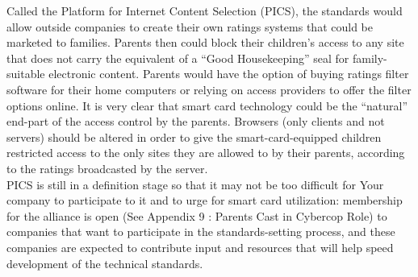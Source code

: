 Called the Platform for Internet Content Selection (PICS), the
standards would allow outside companies to create their own ratings
systems that could be marketed to families. Parents then could block
their children's access to any site that does not carry the equivalent
of a ``Good Housekeeping'' seal for family-suitable electronic content.
Parents would have the option of buying ratings filter software for
their home computers or relying on access providers to offer the filter
options online. It is very clear that smart card technology could be
the ``natural'' end-part of the access control by the parents. Browsers
(only clients and not servers) should be altered in order to give the
smart-card-equipped children restricted access to the only sites they
are allowed to by their parents, according to the ratings broadcasted
by the server.\\

PICS is still in a definition stage so that it may not be too difficult for
Your company to participate to it and to urge for smart card utilization:
membership for the alliance is open (See Appendix 9 :
Parents Cast in Cybercop Role) to companies that want to participate in the
standards-setting process, and these companies are expected to contribute
input and resources that will help speed development of the
technical standards.\\


